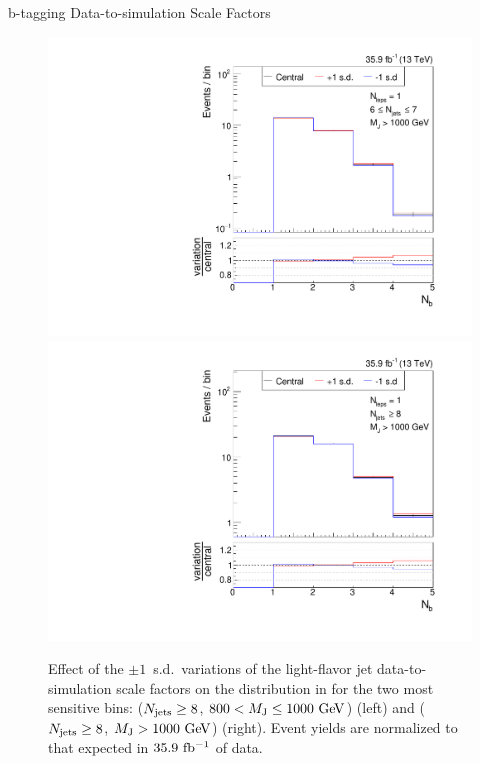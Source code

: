 \begin{section}{b-tagging Data-to-simulation Scale Factors}
\begin{figure}[tbp!]
\begin{center}
\includegraphics[angle=0,width=0.45\columnwidth]{fig/bin20_ttbar_btag_udsg_mconly.pdf}
\includegraphics[angle=0,width=0.45\columnwidth]{fig/bin21_ttbar_btag_udsg_mconly.pdf}
\end{center}
\caption{Effect of the $\pm 1$~s.d.\ variations of the light-flavor jet data-to-simulation scale factors on the \Nb distribution in \ttbar for the two most sensitive bins: ($N_{\mathrm{jets}} \geq 8$, $800 < M_{\mathrm{J}} \leq 1000~\mathrm{Ge\kern -0.1em V}$) (left) and ($N_{\mathrm{jets}} \geq 8$, $M_{\mathrm{J}} > 1000~\mathrm{Ge\kern -0.1em V}$) (right).
Event yields are normalized to that expected in $35.9~\mathrm{fb^{-1}}$ of data.}
\label{fig:sf_udsg_variations}
\end{figure}

\end{section}

